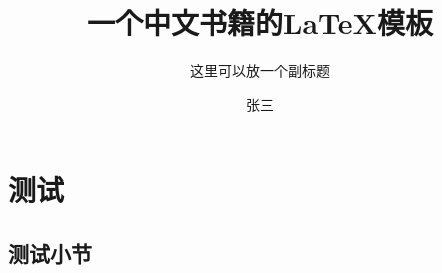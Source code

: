 \documentclass[orange]{tjbook}
\title{一个中文书籍的\LaTeX{}模板}
\subtitle{这里可以放一个副标题}
\author{张三}%
\begin{document}
\maketitle
\makeflypage
\frontmatter
\tableofcontents

\mainmatter
\chapter{测试}
\zhlipsum[1]
\section{测试小节}
\zhlipsum[2-8]
\makebackcover
\end{document}
